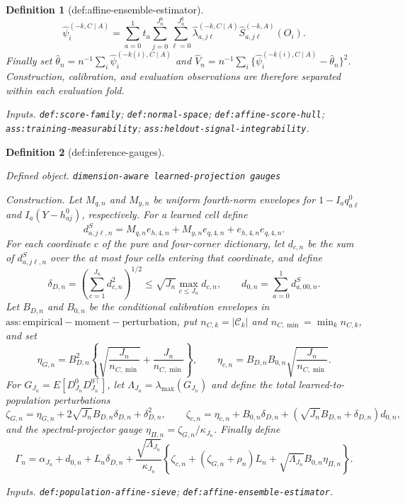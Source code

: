 \documentclass{article}
\newtheorem{definition}{Definition}
\begin{document}
\begin{definition}[def:affine-ensemble-estimator]
\[
 \widehat\psi_i^{(-k,C\mid A)}=
 \sum_{a=0}^1t_a\sum_{j=0}^{J_n^h}\sum_{\ell=0}^{J_n^q}
 \widehat\lambda_{a,j\ell}^{(-k,C\mid A)}
 \widehat S_{a,j\ell}^{(-k,A)}(O_i).
\]
Finally set \(\widehat\theta_n=n^{-1}\sum_i\widehat\psi_i^{(-k(i),C\mid A)}\) and \(\widehat V_n=n^{-1}\sum_i\{\widehat\psi_i^{(-k(i),C\mid A)}-\widehat\theta_n\}^2\).  Construction, calibration, and evaluation observations are therefore separated within each evaluation fold.
\par\smallskip\noindent\emph{Inputs.} \texttt{def:\allowbreak{}score-\allowbreak{}family}; \texttt{def:\allowbreak{}normal-\allowbreak{}space}; \texttt{def:\allowbreak{}affine-\allowbreak{}score-\allowbreak{}hull}; \texttt{ass:\allowbreak{}training-\allowbreak{}measurability}; \texttt{ass:\allowbreak{}heldout-\allowbreak{}signal-\allowbreak{}integrability}.
\end{definition}

\begin{definition}[def:inference-gauges]\label{def:inference-gauges}
\par\smallskip\noindent\emph{Defined object.} \texttt{dimension-\allowbreak{}aware learned-\allowbreak{}projection gauges}
\par\smallskip\noindent\emph{Construction.} Let \(M_{q,n}\) and \(M_{y,n}\) be uniform fourth-norm envelopes for \(1-I_aq^0_{a\ell}\) and \(I_a(Y-h^0_{aj})\), respectively.  For a learned cell define
\[
 d^S_{a,j\ell,n}=M_{q,n}e_{h,4,n}+M_{y,n}e_{q,4,n}+e_{h,4,n}e_{q,4,n}.
\]
For each coordinate \(c\) of the pure and four-corner dictionary, let \(d_{c,n}\) be the sum of \(d^S_{a,j\ell,n}\) over the at most four cells entering that coordinate, and define
\[
 \delta_{D,n}=\left(\sum_{c=1}^{J_n}d_{c,n}^2\right)^{1/2}
 \le \sqrt{J_n}\max_{c\le J_n}d_{c,n},
 \qquad
 d_{0,n}=\sum_{a=0}^1d^S_{a,00,n}.
\]
Let \(B_{D,n}\) and \(B_{0,n}\) be the conditional calibration envelopes in \(\mathrm{ass:empirical-moment-perturbation}\), put \(n_{C,k}=|\mathcal C_k|\) and \(n_{C,\min}=\min_k n_{C,k}\), and set
\[
 \eta_{G,n}=B_{D,n}^2\left\{\sqrt{\frac{J_n}{n_{C,\min}}}
 +\frac{J_n}{n_{C,\min}}\right\},
 \qquad
 \eta_{c,n}=B_{D,n}B_{0,n}\sqrt{\frac{J_n}{n_{C,\min}}}.
\]
For \(G_{J_n}=E[D^0_{J_n}D_{J_n}^{0\top}]\), let \(\Lambda_{J_n}=\lambda_{\max}(G_{J_n})\) and define the total learned-to-population perturbations
\[
 \zeta_{G,n}=\eta_{G,n}+2\sqrt{J_n}B_{D,n}\delta_{D,n}+\delta_{D,n}^2,
 \qquad
 \zeta_{c,n}=\eta_{c,n}+B_{0,n}\delta_{D,n}
 +(\sqrt{J_n}B_{D,n}+\delta_{D,n})d_{0,n},
\]
and the spectral-projector gauge \(\eta_{\Pi,n}=\zeta_{G,n}/\kappa_{J_n}\).  Finally define
\[
 \Gamma_n=\alpha_{J_n}+d_{0,n}+L_n\delta_{D,n}
 +\frac{\sqrt{\Lambda_{J_n}}}{\kappa_{J_n}}
 \left\{\zeta_{c,n}+(\zeta_{G,n}+\rho_n)L_n
 +\sqrt{\Lambda_{J_n}}B_{0,n}\eta_{\Pi,n}\right\}.
\]
\par\smallskip\noindent\emph{Inputs.} \texttt{def:\allowbreak{}population-\allowbreak{}affine-\allowbreak{}sieve}; \texttt{def:\allowbreak{}affine-\allowbreak{}ensemble-\allowbreak{}estimator}.
\end{definition}
\end{document}
